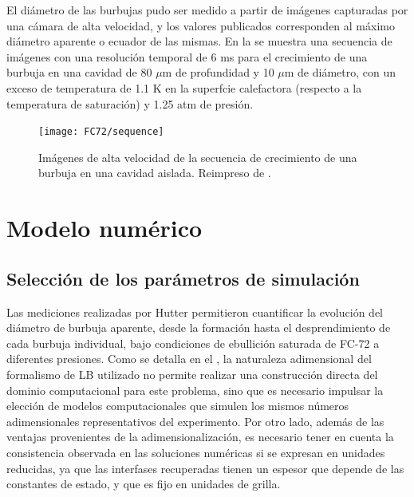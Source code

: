 El di\'ametro de las burbujas pudo ser medido a partir de im\'agenes capturadas por una c\'amara de alta velocidad, y los valores publicados corresponden al m\'aximo di\'ametro aparente o ecuador de las mismas. En la  se muestra una secuencia de im\'agenes con una resoluci\'on temporal de 6 ms para el crecimiento de una burbuja en una cavidad de 80 $\mu$m de profundidad y 10 $\mu$m de di\'ametro, con un exceso de temperatura de 1.1 K en la superfcie calefactora (respecto a la temperatura de saturaci\'on) y 1.25 atm de presi\'on.

\begin{figure}[ht]
	\centering
	\texttt{[image: FC72/sequence]}
	\caption{Im\'agenes de alta velocidad de la secuencia de crecimiento de una burbuja en una cavidad aislada. Reimpreso de \cite{hutter_experimental_2010}.}
	\label{fig:sequence}
\end{figure}





\section{Modelo num\'erico}

\subsection{Selecci\'on de los par\'ametros de simulaci\'on}
\label{sec:param_sim_fc72}

Las mediciones realizadas por Hutter permitieron cuantificar la evoluci\'on del di\'ametro de burbuja aparente, desde la formaci\'on hasta el desprendimiento de cada burbuja individual, bajo condiciones de ebullici\'on saturada de FC-72 a diferentes presiones. Como se detalla en el , la naturaleza adimensional del formalismo de LB utilizado no permite realizar una construcci\'on directa del dominio computacional para este problema, sino que es necesario impulsar la elecci\'on de modelos computacionales que simulen los mismos n\'umeros adimensionales representativos del experimento. Por otro lado, adem\'as de las ventajas provenientes de la adimensionalizaci\'on, es necesario tener en cuenta la consistencia observada en las soluciones num\'ericas si se expresan en unidades reducidas, ya que las interfases recuperadas tienen un espesor que depende de las constantes de estado, y que es fijo en unidades de grilla.

